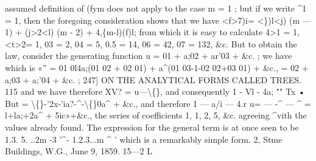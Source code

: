 \documentclass[11pt,a4paper]{book}
\begin{document}
assumed  definition  of  (fym  does  not  apply  to  the  case  m  =  1 ;  but  if  we  write  ^1  =  1,
then  the  foregoing  consideration  shows  that  we  have
<f>7)i=      <\})l<j)  (m  —  1)
+  (j>2<l)  (m  -  2)
+  4,\{m-l)(f)l;
from  which  it  is  easy  to  calculate
4>1  =  1,  <t>2=  1,  03  =  2,  04  =  5,  0.5  =  14,  06  =  42,  07  =  132,  \&c.
But  to  obtain  the  law,  consider  the  generating  function
u  =  01  +        a;02  +  ar'03  +  \&c. ;
we  have
which   is
«''  =  01  0l4a;(01  02  +  02  01)  +  a^(01  03-1-02  02+03  01)  +  \&c.,
=  02  +        a;03  +
a;'04  +  \&c. ;
247]  ON  THE   ANALYTICAL   FORMS   CALLED   TREES.  115
and  we  have  therefore
XV?  =  u—\textbackslash\{\},
and  consequently
1  -  Vl  -  4a;
""   Tx  •
But
=  \textbackslash\{\}-'2x-'ia?-^-\textbackslash\{\}0a^  +  \&c.,
and  therefore
1  —  a/i  —  4.r
u=   — -^ — ^  =  l+la;+2a^  +  5ic»+\&c.,
the   series   of  coefficients   1,  1,  2,  5,  \&c.   agreeing  ^vith   the   values   already   found.     The
expression  for  the  general  term  is  at  once  seen  to  be
1.3.  5. ..2m -3
'^-       1.2.3...m      ^      '
which   is  a  remarkably  simple   form.
2,  Stme  Buildings,  W.G.,  June  9,  1859.
15—2
L


\newpage
\end{document}
